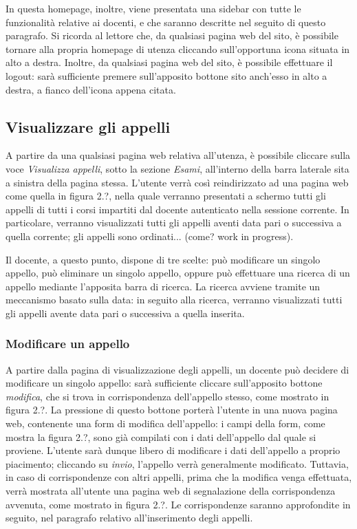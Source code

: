 \documentclass [a4paper,11pt]{book}
\begin{document}
In questa homepage, inoltre, viene presentata una sidebar con tutte le funzionalità relative ai docenti, e che saranno descritte nel seguito di questo paragrafo. Si ricorda al lettore che, da qualsiasi pagina web del sito, è possibile tornare alla propria homepage di utenza cliccando sull'opportuna icona situata in alto a destra. Inoltre, da qualsiasi pagina web del sito, è possibile effettuare il logout: sarà sufficiente premere sull'apposito bottone sito anch'esso in alto a destra, a fianco dell'icona appena citata.

\medskip

\subsection{Visualizzare gli appelli}
\label{sec:visualizzaAppelli}

A partire da una qualsiasi pagina web relativa all'utenza, è possibile cliccare sulla voce \emph{Visualizza appelli}, sotto la sezione \emph{Esami}, all'interno della barra laterale sita a sinistra della pagina stessa. L'utente verrà così reindirizzato ad una pagina web come quella in figura 2.?, nella quale verranno presentati a schermo tutti gli appelli di tutti i corsi impartiti dal docente autenticato nella sessione corrente. In particolare, verranno visualizzati tutti gli appelli aventi data pari o successiva a quella corrente; gli appelli sono ordinati... (come? work in progress).%

Il docente, a questo punto, dispone di tre scelte: può modificare un singolo appello, può eliminare un singolo appello, oppure può effettuare una ricerca di un appello mediante l'apposita barra di ricerca. La ricerca avviene tramite un meccanismo basato sulla data: in seguito alla ricerca, verranno visualizzati tutti gli appelli avente data pari o successiva a quella inserita.

\medskip

\subsubsection{Modificare un appello}

A partire dalla pagina di visualizzazione degli appelli, un docente può decidere di modificare un singolo appello: sarà sufficiente cliccare sull'apposito bottone \emph{modifica}, che si trova in corrispondenza dell'appello stesso, come mostrato in figura 2.?. La pressione di questo bottone porterà l'utente in una nuova pagina web, contenente una form di modifica dell'appello: i campi della form, come mostra la figura 2.?, sono già compilati con i dati dell'appello dal quale si proviene. L'utente sarà dunque libero di modificare i dati dell'appello a proprio piacimento; cliccando su \emph{invio}, l'appello verrà generalmente modificato. Tuttavia, in caso di corrispondenze con altri appelli, prima che la modifica venga effettuata, verrà mostrata all'utente una pagina web di segnalazione della corrispondenza avvenuta, come mostrato in figura 2.?. Le corrispondenze saranno approfondite in seguito, nel paragrafo relativo all'inserimento degli appelli.
\end{document}
